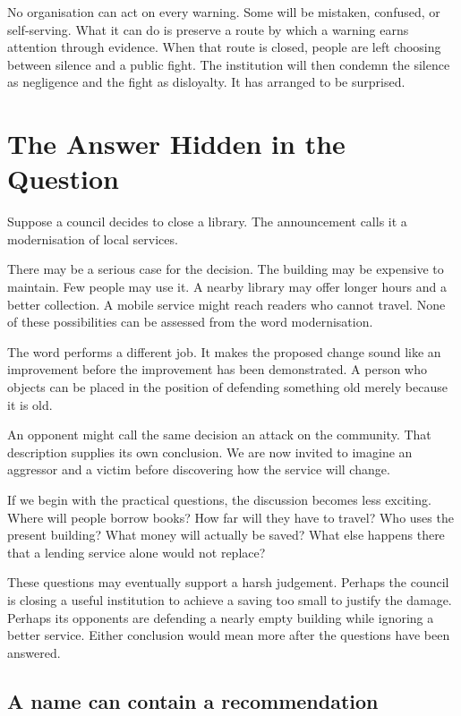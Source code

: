\documentclass[12pt,a4paper]{book}
\begin{document}
No organisation can act on every warning. Some will be mistaken, confused, or self-serving. What it can do is preserve a route by which a warning earns attention through evidence. When that route is closed, people are left choosing between silence and a public fight. The institution will then condemn the silence as negligence and the fight as disloyalty. It has arranged to be surprised.

\chapter{The Answer Hidden in the Question}

Suppose a council decides to close a library. The announcement calls it a modernisation of local services.

There may be a serious case for the decision. The building may be expensive to maintain. Few people may use it. A nearby library may offer longer hours and a better collection. A mobile service might reach readers who cannot travel. None of these possibilities can be assessed from the word modernisation.

The word performs a different job. It makes the proposed change sound like an improvement before the improvement has been demonstrated. A person who objects can be placed in the position of defending something old merely because it is old.

An opponent might call the same decision an attack on the community. That description supplies its own conclusion. We are now invited to imagine an aggressor and a victim before discovering how the service will change.

If we begin with the practical questions, the discussion becomes less exciting. Where will people borrow books? How far will they have to travel? Who uses the present building? What money will actually be saved? What else happens there that a lending service alone would not replace?

These questions may eventually support a harsh judgement. Perhaps the council is closing a useful institution to achieve a saving too small to justify the damage. Perhaps its opponents are defending a nearly empty building while ignoring a better service. Either conclusion would mean more after the questions have been answered.

\section*{A name can contain a recommendation}
\end{document}

